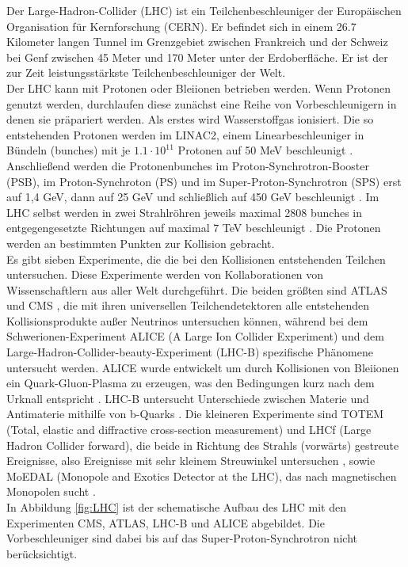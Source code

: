 Der Large-Hadron-Collider (LHC) ist ein Teilchenbeschleuniger der Europ\"aischen Organisation f\"ur Kernforschung (CERN). Er befindet sich in einem \num{26,7} Kilometer langen Tunnel im Grenzgebiet zwischen Frankreich und der Schweiz bei Genf zwischen \num{45} Meter und \num{170} Meter unter der Erdoberfl\"ache. Er ist der zur Zeit leistungsst\"arkste Teilchenbeschleuniger der Welt.\\
Der LHC kann mit Protonen oder Bleiionen betrieben werden. Wenn Protonen genutzt werden, durchlaufen diese zun\"achst eine Reihe von Vorbeschleunigern in denen sie pr\"apariert werden. Als erstes wird Wasserstoffgas ionisiert. Die so entstehenden Protonen werden im LINAC2, einem Linearbeschleuniger in B\"undeln (bunches) mit je $\num{1,1}\cdot\num{10}^{\num{11}}$ Protonen auf 50 MeV beschleunigt \cite{O'Luanaigh:1997427}. Anschlie\ss end werden die Protonenbunches im Proton-Synchrotron-Booster (PSB), im Proton-Synchroton (PS) und im Super-Proton-Synchrotron (SPS) erst auf 1,4 GeV, dann auf 25 GeV und schlie\ss lich auf 450 GeV beschleunigt \cite{O'Luanaigh:1997193}. Im LHC selbst werden in zwei Strahlr\"ohren jeweils maximal 2808 bunches in entgegengesetzte Richtungen auf maximal 7 TeV beschleunigt \cite{Lefevre:1165534}. Die Protonen werden an bestimmten Punkten zur Kollision gebracht. \\
Es gibt sieben Experimente, die die bei den Kollisionen entstehenden Teilchen untersuchen. Diese Experimente werden von Kollaborationen von Wissenschaftlern aus aller Welt durchgef\"uhrt. Die beiden gr\"o\ss ten sind ATLAS \cite{ATLAS} und CMS \cite{CMS}, die mit ihren universellen Teilchendetektoren alle entstehenden Kollisionsprodukte au\ss er Neutrinos untersuchen k\"onnen, w\"ahrend bei dem Schwerionen-Experiment ALICE (A Large Ion Collider Experiment) und dem Large-Hadron-Collider-beauty-Experiment (LHC-B) spezifische Ph\"anomene untersucht werden. ALICE wurde entwickelt um durch Kollisionen von Bleiionen ein Quark-Gluon-Plasma zu erzeugen, was den Bedingungen kurz nach dem Urknall entspricht \cite{ALICE}. LHC-B untersucht Unterschiede zwischen Materie und Antimaterie mithilfe von b-Quarks \cite{LHCb}. Die kleineren Experimente sind TOTEM (Total, elastic and diffractive cross-section measurement) und LHCf (Large Hadron Collider forward), die beide in Richtung des Strahls (\glqq vorw\"arts\grqq) gestreute Ereignisse, also Ereignisse mit sehr kleinem Streuwinkel untersuchen \cite{LHCf,TOTEM}, sowie MoEDAL (Monopole and Exotics Detector at the LHC), das nach magnetischen Monopolen sucht \cite{MoEDAL}.\\%
In Abbildung \ref{fig:LHC} ist der schematische Aufbau des LHC mit den Experimenten CMS, ATLAS, LHC-B und ALICE abgebildet. Die Vorbeschleuniger sind dabei bis auf das Super-Proton-Synchrotron nicht ber\"ucksichtigt.


